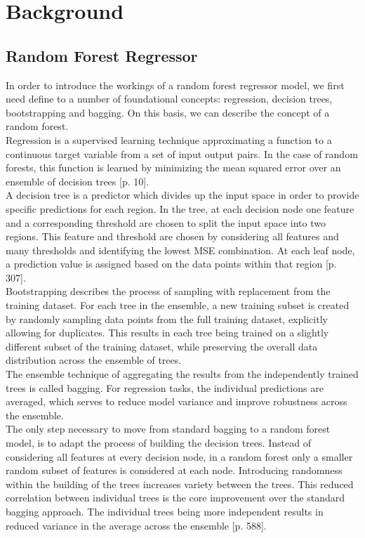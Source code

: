 \chapter{Background}\label{chap:background}




\section{Random Forest Regressor}

In order to introduce the workings of a random forest regressor model, we first need define to a number of foundational concepts: regression, decision trees, bootstrapping and bagging. On this basis, we can describe the concept of a random forest. \\
Regression is a supervised learning technique approximating a function to a continuous target variable from a set of input output pairs. In the case of random forests, this function is learned by minimizing the mean squared error over an ensemble of decision trees \citep{hastie_elements_2009}[p. 10]. \\
A decision tree is a predictor which divides up the input space in order to provide specific predictions for each region. In the tree, at each decision node one feature and a corresponding threshold are chosen to split the input space into two regions. This feature and threshold are chosen by considering all features and many thresholds and identifying the lowest MSE combination. At each leaf node, a prediction value is assigned based on the data points within that region \citep{hastie_elements_2009}[p. 307]. \\
Bootstrapping describes the process of sampling with replacement from the training dataset. For each tree in the ensemble, a new training subset is created by randomly sampling data points from the full training dataset, explicitly allowing for duplicates. This results in each tree being trained on a slightly different subset of the training dataset, while preserving the overall data distribution across the ensemble of trees. \\
The ensemble technique of aggregating the results from the independently trained trees is called bagging. For regression tasks, the individual predictions are averaged, which serves to reduce model variance and improve robustness across the ensemble. \\
The only step necessary to move from standard bagging to a random forest model, is to adapt the process of building the decision trees. Instead of considering all features at every decision node, in a random forest only a smaller random subset of features is considered at each node. Introducing randomness within the building of the trees increases variety between the trees. This reduced correlation between individual trees is the core improvement over the standard bagging approach. The individual trees being more independent results in reduced variance in the average across the ensemble \citep{hastie_elements_2009}[p. 588]. \\
